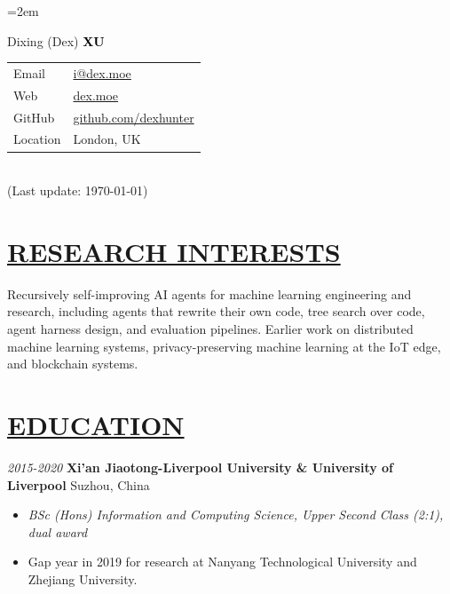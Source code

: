 \documentclass[11pt]{article}
\begin{document}
\emergencystretch=2em

\noindent\begin{minipage}[t]{0.58\textwidth}
    {\Huge Dixing (Dex) {\textbf{\textcolor{black}{XU}}}}
\end{minipage}\hfill
\begin{minipage}[t]{0.4\textwidth}
    {\small\raggedright
    \begin{tabular}{l@{: }l}
    Email & \href{mailto:i@dex.moe}{i@dex.moe} \\
    Web & \href{https://dex.moe}{dex.moe} \\
    GitHub & \href{https://github.com/dexhunter}{github.com/dexhunter} \\
    Location & London, UK \\
    \end{tabular}\\
    (Last update: \today)
    }
\end{minipage}


%
\section*{\centering\underline{RESEARCH INTERESTS}}
\noindent Recursively self-improving AI agents for machine learning engineering and research, including agents that rewrite their own code, tree search over code, agent harness design, and evaluation pipelines. Earlier work on distributed machine learning systems, privacy-preserving machine learning at the IoT edge, and blockchain systems.
\vspace{20mm} %

%

\section*{\centering\underline{EDUCATION}}
\noindent\textit{2015-2020} {\large\textbf{Xi'an Jiaotong-Liverpool University \& University of Liverpool} \hfill Suzhou, China}
\begin{itemize}[noitemsep, nolistsep]
    \item[] \textit{BSc (Hons) Information and Computing Science, Upper Second Class (2:1), dual award}
    \item[] Gap year in 2019 for research at Nanyang Technological University and Zhejiang University.
\end{itemize}
\vspace{20mm} %
\end{document}
